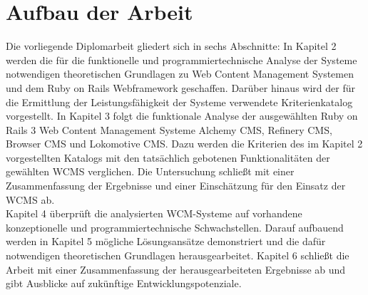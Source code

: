 \section{Aufbau der Arbeit}
Die vorliegende Diplomarbeit gliedert sich in sechs Abschnitte:
\newline
\newline
In Kapitel 2 werden die für die funktionelle und programmiertechnische Analyse der Systeme notwendigen theoretischen Grundlagen zu Web Content Management Systemen und dem Ruby on Rails Webframework geschaffen.
Darüber hinaus wird der für die Ermittlung der Leistungsfähigkeit der Systeme verwendete Kriterienkatalog vorgestellt.
\newline
\newline
In Kapitel 3 folgt die funktionale Analyse der ausgewählten Ruby on Rails 3 Web Content Management Systeme Alchemy CMS, Refinery CMS, Browser CMS und Lokomotive CMS. Dazu werden die Kriterien des im Kapitel 2 vorgestellten Katalogs mit den tatsächlich gebotenen Funktionalitäten der gewählten WCMS verglichen. Die Untersuchung schließt mit einer Zusammenfassung der Ergebnisse und einer Einschätzung für den Einsatz der WCMS ab.\\
\newline
Kapitel 4 überprüft die analysierten WCM-Systeme auf vorhandene konzeptionelle und programmiertechnische Schwachstellen.
Darauf aufbauend werden in Kapitel 5 mögliche Lösungsansätze demonstriert und die dafür notwendigen theoretischen Grundlagen herausgearbeitet.
Kapitel 6 schließt die Arbeit mit einer Zusammenfassung der herausgearbeiteten Ergebnisse ab und gibt Ausblicke auf zukünftige Entwicklungspotenziale.
%
%

